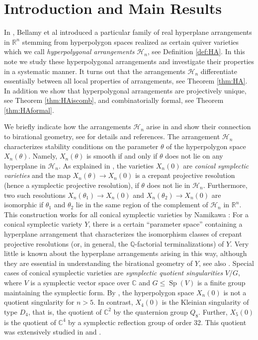 \documentclass[12pt]{amsart}
\newcommand\CH{{\mathscr H}}
\newcommand\BBC{{\mathbb C}}
\newcommand\BBQ{{\mathbb Q}}
\newcommand\BBR{{\mathbb R}}
\numberwithin{equation}{section}
\theoremstyle{plain}
\theoremstyle{definition}
\begin{document}
\section{Introduction and Main Results}

In \cite{bellamyetall:crepant},
Bellamy et al
introduced a particular family of real hyperplane arrangements in $\BBR^n$ stemming from 
hyperpolygon spaces realized as certain 
quiver varieties which we call 
\emph{hyperpolygonal arrangements} $\CH_n$, see Definition \ref{def:HA}.
In this note we study these
hyperpolygonal arrangements and 
investigate their properties in a systematic manner. 
It turns out that the arrangements 
$\CH_n$ differentiate essentially between all local properties of arrangements, see Theorem \ref{thm:HA}.
In addition we show that hyperpolygonal arrangements are projectively unique, see Theorem \ref{thm:HAiscomb}, and combinatorially formal, see Theorem \ref{thm:HAformal}.

We briefly indicate how the arrangements \(\CH_n\) arise in \cite{bellamyetall:crepant} and show their connection to birational geometry, see \cite{bellamyetall:crepant} for details and references.
The arrangement \(\CH_n\) characterizes stability conditions on the parameter \(\theta\) of the hyperpolygon space \(X_n(\theta)\).
Namely, \(X_n(\theta)\) is smooth if and only if \(\theta\) does not lie on any hyperplane in \(\CH_n\).
As explained in \cite{bellamyetall:crepant}, the varieties \(X_n(0)\) are \emph{conical symplectic varieties} and the map \(X_n(\theta) \to X_n(0)\) is a crepant projective resolution (hence a symplectic projective resolution), if \(\theta\) does not lie in \(\CH_n\).
Furthermore, two such resolutions \(X_n(\theta_1) \to X_n(0)\) and \(X_n(\theta_2) \to X_n(0)\) are isomorphic if \(\theta_1\) and \(\theta_2\) lie in the same region of the complement of \(\CH_n\)  in $\BBR^n$.
This construction works for all conical symplectic varieties by Namikawa \cite{Nam15}:
For a conical symplectic variety \(Y\), there is a certain ``parameter space'' containing a hyperplane arrangement that characterizes the isomorphism classes of crepant projective resolutions (or, in general, the \(\BBQ\)-factorial terminalizations) of \(Y\).
Very little is known about the hyperplane arrangements arising in this way, although they are essential in understanding the birational geometry of \(Y\), see also \cite{Bel16, BST18}.
Special cases of conical symplectic varieties are \emph{symplectic quotient singularities} \(V/G\), where \(V\) is a symplectic vector space over \(\BBC\) and \(G\leq\operatorname{Sp}(V)\) is a finite group maintaining the symplectic form.
By \cite{bellamyetall:crepant}, the hyperpolygon space \(X_n(0)\) is not a quotient singularity for \(n > 5\).
In contrast, $X_4(0)$ is the Kleinian singularity of type $D_4$, that is, the quotient of $\BBC^2$ by the quaternion group $Q_8$.  Further, 
\(X_5(0)\) is the quotient of \(\BBC^4\) by a symplectic reflection group of order 32.
This quotient was extensively studied in \cite{BS13} and \cite{DW17}.
\end{document}
